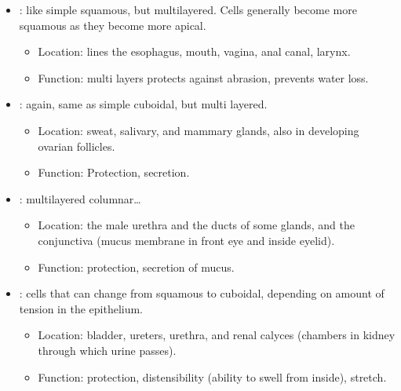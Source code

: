 \begin{itemize}
\begin{itemize}
\begin{itemize}
      \end{itemize}
    \item {}: like simple squamous, but multilayered. Cells generally become more squamous as they become more apical.
      \begin{itemize}
        \item Location: lines the esophagus, mouth, vagina, anal canal, larynx. 
        \item Function: multi layers protects against abrasion, prevents water loss.
      \end{itemize}
    \item {}: again, same as simple cuboidal, but multi layered.
      \begin{itemize}
        \item Location: sweat, salivary, and mammary glands, also in developing ovarian follicles.
        \item Function: Protection, secretion.
      \end{itemize}
    \item {}: multilayered columnar\dots
      \begin{itemize}
        \item Location: the male urethra and the ducts of some glands, and the conjunctiva (mucus membrane in front eye and inside eyelid).
        \item Function: protection, secretion of mucus.
      \end{itemize}
    \item {}: cells that can change from squamous to cuboidal, depending on amount of tension in the epithelium.
      \begin{itemize}
        \item Location: bladder, ureters, urethra, and renal calyces (chambers in kidney through which urine passes).
        \item Function: protection, distensibility (ability to swell from inside), stretch.
      \end{itemize}
  \end{itemize}
  
\end{itemize}

\newpage

